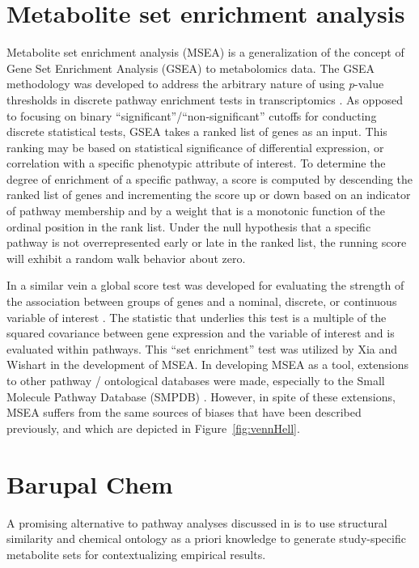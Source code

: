 \begin{DoubleSpace*}
\section{Metabolite set enrichment analysis}
Metabolite set enrichment analysis (MSEA)\cite{xia2010b} is a generalization of the concept of Gene Set Enrichment Analysis (GSEA) \cite{mootha2003,subramanian2005} to metabolomics data. The GSEA methodology was developed to address the arbitrary nature of using \emph{p}-value thresholds in discrete pathway enrichment tests in transcriptomics \cite{subramanian2005}. As opposed to focusing on binary ``significant''/``non-significant'' cutoffs for conducting discrete statistical tests, GSEA takes a ranked list of genes as an input. This ranking may be based on statistical significance of differential expression, or correlation with a specific phenotypic attribute of interest. To determine the degree of enrichment of a specific pathway, a score is computed by descending the ranked list of genes and incrementing the score up or down based on an indicator of pathway membership and by a weight that is a monotonic function of the ordinal position in the rank list. Under the null hypothesis that a specific pathway is not overrepresented early or late in the ranked list, the running score will exhibit a random walk behavior about zero.

In a similar vein a global score test was developed for evaluating the strength of the association between groups of genes and a nominal, discrete, or continuous variable of interest \cite{goeman2003}. The statistic that underlies this test is a multiple of the squared covariance between gene expression and the variable of interest and is evaluated within pathways. This ``set enrichment'' test was utilized by Xia and Wishart \cite{xia2010b} in the development of MSEA. In developing MSEA as a tool, extensions to other pathway / ontological databases were made, especially to the Small Molecule Pathway Database (SMPDB) \cite{frolkis2010}. However, in spite of these extensions, MSEA suffers from the same sources of biases that have been described previously, and which are depicted in Figure~\ref{fig:vennHell}.

\section{Barupal Chem}
A promising alternative to pathway analyses discussed in \cite{barupal2017} is to use structural similarity and chemical ontology as a priori knowledge to generate study-specific metabolite sets for contextualizing empirical results. 


\end{DoubleSpace*}
